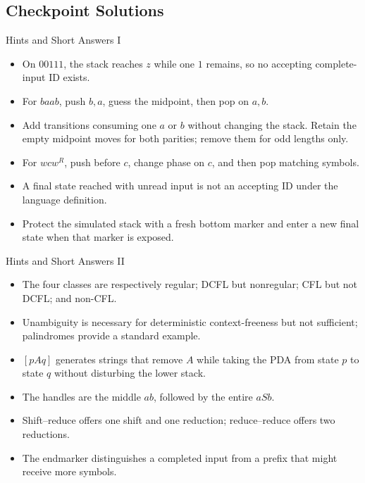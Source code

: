\documentclass[10pt]{beamer}
\begin{document}
\subsection{Checkpoint Solutions}

\begin{frame}{Hints and Short Answers I}
  \small
  \begin{itemize}
    \item On $00111$, the stack reaches $z$ while one $1$ remains, so no accepting complete-input ID exists.
    \item For $baab$, push $b,a$, guess the midpoint, then pop on $a,b$.
    \item Add transitions consuming one $a$ or $b$ without changing the stack.
      Retain the empty midpoint moves for both parities; remove them for odd lengths only.
    \item For $wcw^R$, push before $c$, change phase on $c$, and then pop matching symbols.
    \item A final state reached with unread input is not an accepting ID under the language definition.
    \item Protect the simulated stack with a fresh bottom marker and enter a new final state when that marker is exposed.
  \end{itemize}
\end{frame}

\begin{frame}{Hints and Short Answers II}
  \small
  \begin{itemize}
    \item The four classes are respectively regular; DCFL but nonregular; CFL but not DCFL; and non-CFL.
    \item Unambiguity is necessary for deterministic context-freeness but not sufficient; palindromes provide a standard example.
    \item $[pAq]$ generates strings that remove $A$ while taking the PDA from state $p$ to state $q$ without disturbing the lower stack.
    \item The handles are the middle $ab$, followed by the entire $aSb$.
    \item Shift--reduce offers one shift and one reduction; reduce--reduce offers two reductions.
    \item The endmarker distinguishes a completed input from a prefix that might receive more symbols.
  \end{itemize}
\end{frame}
\end{document}
